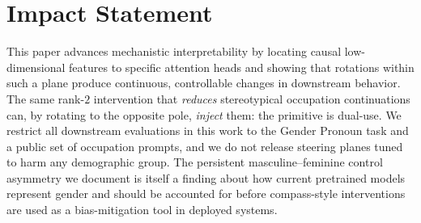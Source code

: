 \documentclass{article}
\theoremstyle{plain}
\theoremstyle{definition}
\theoremstyle{remark}
\begin{document}

\printAffiliationsAndNotice{}  %




\section*{Impact Statement}

This paper advances mechanistic interpretability by locating
causal low-dimensional features to specific attention heads and
showing that rotations within such a plane produce continuous,
controllable changes in downstream behavior. The same rank-$2$
intervention that \emph{reduces} stereotypical occupation
continuations can, by rotating to the opposite pole, \emph{inject}
them: the primitive is dual-use. We restrict all downstream
evaluations in this work to the Gender Pronoun task and a public
set of occupation prompts, and we do not release steering planes
tuned to harm any demographic group. The persistent
masculine--feminine control asymmetry we document is itself a
finding about how current pretrained models represent gender and
should be accounted for before compass-style interventions are
used as a bias-mitigation tool in deployed systems.




\newpage
\appendix
\onecolumn

\end{document}
